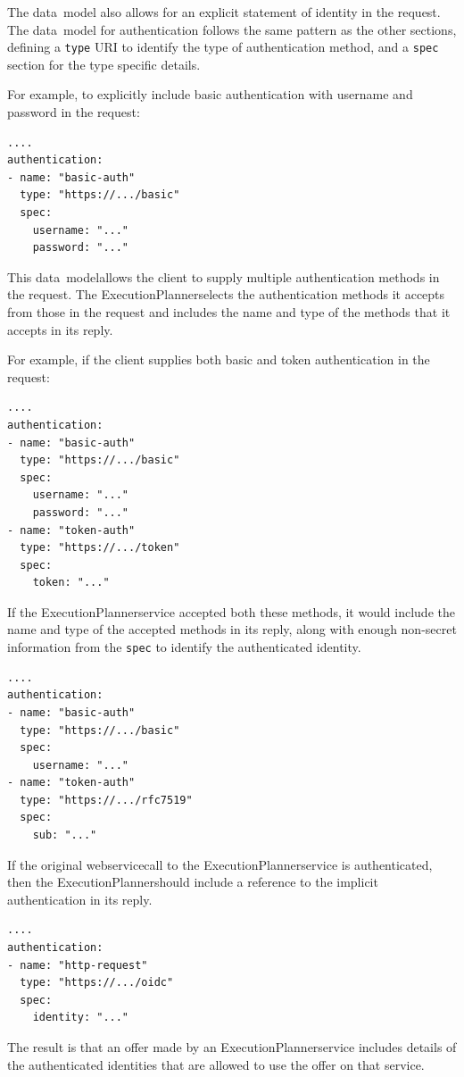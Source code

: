 \documentclass[11pt,a4paper]{ivoa}
\newcommand{\datamodel} {data~model}
\newcommand{\webservice} {webservice}
\newcommand{\execplanner} {ExecutionPlanner}
\newcommand{\codeword}[1] {\texttt{#1}}
\begin{document}
The \datamodel{} also allows for an explicit statement of identity in the request.
The \datamodel{} for authentication follows the same pattern as the other sections,
defining a \codeword{type} URI to identify the type of authentication method,
and a \codeword{spec} section for the type specific details.

For example, to explicitly include basic authentication with username and password
in the request:
\begin{lstlisting}[]
....
authentication:
- name: "basic-auth"
  type: "https://.../basic"
  spec:
    username: "..."
    password: "..."
\end{lstlisting}

This \datamodel allows the client to supply multiple authentication methods
in the request. The \execplanner selects the authentication methods it
accepts from those in the request and includes the name and type of the
methods that it accepts in its reply.

For example, if the client supplies both basic and token authentication
in the request:
\begin{lstlisting}[]
....
authentication:
- name: "basic-auth"
  type: "https://.../basic"
  spec:
    username: "..."
    password: "..."
- name: "token-auth"
  type: "https://.../token"
  spec:
    token: "..."
\end{lstlisting}

If the \execplanner service accepted both these methods, it would include the
name and type of the accepted methods in its reply, along with enough non-secret
information from the \codeword{spec} to identify the authenticated identity.
\begin{lstlisting}[]
....
authentication:
- name: "basic-auth"
  type: "https://.../basic"
  spec:
    username: "..."
- name: "token-auth"
  type: "https://.../rfc7519"
  spec:
    sub: "..."
\end{lstlisting}

If the original \webservice call to the \execplanner service is authenticated,
then the \execplanner should include a reference to the implicit authentication
in its reply.

\begin{lstlisting}[]
....
authentication:
- name: "http-request"
  type: "https://.../oidc"
  spec:
    identity: "..."
\end{lstlisting}

The result is that an offer made by an \execplanner service includes details of the
authenticated identities that are allowed to use the offer on that service.
\end{document}
